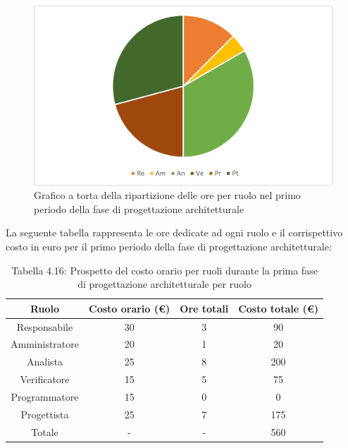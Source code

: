 \begin{figure}[H]
    \centering
    \includegraphics[scale=0.6]{img/grafi preventivo/torta/architetturale/periodo1.png}
    \caption{Grafico a torta della ripartizione delle ore per ruolo nel primo periodo della fase di progettazione architetturale}
\end{figure}
La seguente tabella rappresenta le ore dedicate ad ogni ruolo e il corrispettivo costo in euro per il primo periodo della fase di progettazione architetturale:
\begin{table}[h]
	\setlength\extrarowheight{5pt}
	\centering
	\begin{tabularx}{\textwidth}{|ccc|c|}
		\hline
		\rowcolor{white}
		\textbf{Ruolo} & \textbf{Costo orario (€)} & \textbf{Ore totali} & \textbf{Costo totale (€)} \\
		\hline
		Responsabile &30&3&90 \\
		Amministratore &20&1&20 \\
		Analista &25&8&200 \\
		Verificatore &15&5&75 \\
		Programmatore &15&0&0 \\
		Progettista &25&7&175 \\
		\hline
		Totale &-&-&560 \\
		\hline
	\end{tabularx}
    \vspace{10pt}
	\caption{Tabella 4.16: Prospetto del costo orario per ruoli durante la prima fase di progettazione architetturale per ruolo}
\end{table}
\newpage
